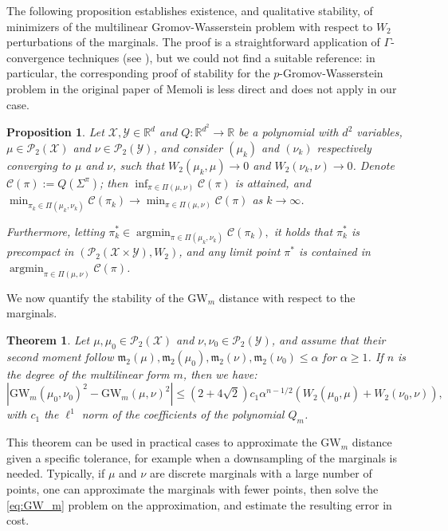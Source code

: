 \documentclass{article}
\newcommand{\R}{\mathbb{R}}
\newcommand{\Y}{\mathcal{Y}}
\newcommand{\X}{\mathcal{X}}
\newcommand{\1}{\mathbf{1}}
\newcommand{\GW}{\mathrm{GW}}
\DeclareMathOperator*{\argmin}{argmin}
\newtheorem{theorem}{Theorem}
\newtheorem{proposition}{Proposition}
\theoremstyle{definition}
\theoremstyle{remark}
\begin{document}
The following proposition establishes existence, and  qualitative stability, of  minimizers of the multilinear
Gromov-Wasserstein problem with respect to $W_2$ perturbations of the marginals. The proof is a straightforward application of $\Gamma$-convergence techniques (see \cite{braides2002gamma}), but we
could not find a suitable reference: in particular, the corresponding
proof of stability for the $p$-Gromov-Wasserstein problem in the
original paper of Memoli \cite{memoli2011gromov} is less direct and
does not apply in our case.
\begin{proposition}
\label{prop:stability-general}
Let $\X,\Y\in \R^d$ and $Q:\R^{d^2}\to\R$ be a polynomial with $d^2$ variables, $\mu\in\mathcal{P}_2(\X)$ and $\nu\in\mathcal{P}_2(\Y)$, and consider $(\mu_k)$ and $(\nu_k)$  respectively converging to $\mu$ and $\nu$, such that 
$W_2 (\mu_{k},\mu)\rightarrow 0$ and $W_2(\nu_{k},\nu)\rightarrow 0$. Denote $\mathcal{C}(\pi):=Q(\Sigma^\pi)$; then $\inf_{\pi \in \Pi(\mu,\nu)} \mathcal{C}(\pi)$ is attained, and $\min_{\pi_k \in \Pi(\mu_k,\nu_k)} \mathcal{C}(\pi_k)\rightarrow \min_{\pi \in \Pi(\mu,\nu)} \mathcal{C}(\pi)$
as $k\rightarrow\infty$. 

Furthermore, letting $\pi_{k}^{*}\in\argmin_{\pi\in\Pi(\mu_{k},\nu_{k})}\mathcal{C}(\pi_k),$ it holds that $\pi_{k}^{*}$ is precompact in $(\mathcal{P}_2(\X\times \Y),W_2)$,
and any limit point $\pi^{*}$ is contained in $\argmin_{\pi\in\Pi(\mu,\nu)}\mathcal{C}(\pi)$.
\end{proposition}
We now quantify the stability of the $\GW_m$ distance with respect to the marginals.
\begin{theorem}\label{theo:sample_complexity}
 Let $\mu,\mu_0\in\mathcal{P}_2(\X)$ and $\nu,\nu_0\in\mathcal{P}_2(\Y)$, and assume that their  second moment follow  $\mathfrak{m}_2(\mu),\mathfrak{m}_2(\mu_0),\mathfrak{m}_2(\nu),\mathfrak{m}_2(\nu_0)\leq \alpha$ for $\alpha\geq1$. If $n$ is the degree of the multilinear form $m$, then we have:
    \begin{equation}\label{eq:GW_conver_W_2}
        |\GW_m(\mu_0,\nu_0)^2-\GW_m(\mu,\nu)^2|\leq (2+4\sqrt{2}) c_1 \alpha^{n-1/2} (W_2 (\mu_{0},\mu)+W_2(\nu_{0},\nu)),
    \end{equation} 
with $c_1$ the $\ell^1$ norm of the coefficients of the polynomial $Q_m$.
\end{theorem}
This theorem can be used in practical cases to approximate the $\GW_m$ distance given a specific tolerance, for example when a downsampling of the marginals is needed. Typically, if $\mu$ and $\nu$ are discrete marginals with a large number of points, one can approximate the marginals with fewer points, then solve the \ref{eq:GW_m} problem on the approximation, and estimate the resulting error in cost.
\end{document}
